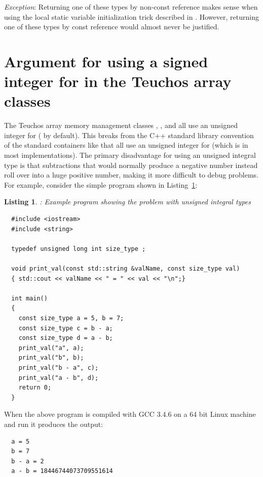 \documentclass[pdf,ps2pdf,11pt]{SANDreport}
\newtheorem{listing}{Listing}
\begin{document}
{}\textit{Exception}: Returning one of these types by non-const
reference makes sense when using the local static variable
initialization trick described in {}\cite[Item
4]{EffectiveC++ThirdEdition}.  However, returning one of these types
by const reference would almost never be justified.


%
{}\section{Argument for using a signed integer for
{} in the Teuchos array classes}
\label{sec:unsigned_size_type}
%

The Teuchos array memory management classes {},
{}, and {} all use an unsigned integer
for {} ({} by default).  This breaks
from the C++ standard library convention of the standard containers
like {} that all use an unsigned integer for
{} (which is {} in most implementations).
The primary disadvantage for using an unsigned integral type is that
subtractions that would normally produce a negative number instead
roll over into a huge positive number, making it more difficult to
debug problems.  For example, consider the simple program shown in
Listing~\ref{listing:unsigned-int-problem}:


{}\begin{listing}: Example program showing the problem with unsigned
integral types
\label{listing:unsigned-int-problem}
{\small\begin{verbatim}
  #include <iostream>
  #include <string>
  
  typedef unsigned long int size_type ;
  
  void print_val(const std::string &valName, const size_type val)
  { std::cout << valName << " = " << val << "\n";}
  
  int main()
  {
    const size_type a = 5, b = 7;
    const size_type c = b - a;
    const size_type d = a - b;
    print_val("a", a);
    print_val("b", b);
    print_val("b - a", c);
    print_val("a - b", d);
    return 0;
  }
\end{verbatim}}
\end{listing}


When the above program is compiled with GCC 3.4.6 on a 64 bit Linux
machine and run it produces the output:


{\small\begin{verbatim}
  a = 5
  b = 7
  b - a = 2
  a - b = 18446744073709551614
\end{verbatim}}
\end{document}
